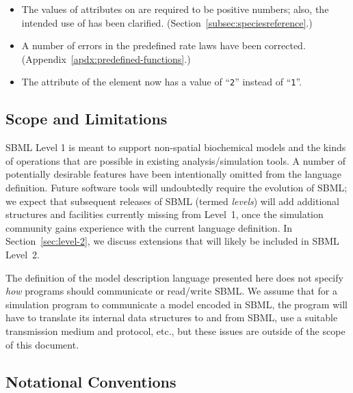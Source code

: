 \documentclass[10pt]{cekarticle}
\newenvironment{blockChanged}{\color{BrickRed}}{}
\begin{document}
\begin{blockChanged}
\begin{itemize}
\item The values of attributes on  are required to
  be positive numbers; also, the intended use of 
  has been clarified.  (Section~\ref{subsec:speciesreference}.)

\item A number of errors in the predefined rate laws have been corrected.
  (Appendix~\ref{apdx:predefined-functions}.)
  
\item The  attribute of the  element now has a
  value of ``\texttt{2}'' instead of ``\texttt{1}''.
  
\end{itemize}
\end{blockChanged}


\subsection{Scope and Limitations}

SBML Level 1 is meant to support non-spatial biochemical models and the
kinds of operations that are possible in existing analysis/simulation
tools.  A number of potentially desirable features have been intentionally
omitted from the language definition.  Future software tools will
undoubtedly require the evolution of SBML; we expect that subsequent
releases of SBML (termed \emph{levels}) will add additional structures and
facilities currently missing from Level~1, once the simulation community
gains experience with the current language definition.  In
Section~\ref{sec:level-2}, we discuss extensions that will likely be
included in SBML Level~2.

The definition of the model description language presented here does not
specify \emph{how} programs should communicate or read/write SBML.  We
assume that for a simulation program to communicate a model encoded in
SBML, the program will have to translate its internal data structures to
and from SBML, use a suitable transmission medium and protocol, etc., but
these issues are outside of the scope of this document.


\subsection{Notational Conventions}
\end{document}

